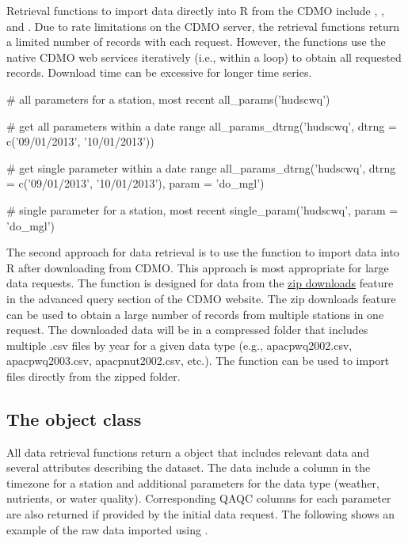 Retrieval functions to import data directly into R from the CDMO include , , and . Due to rate limitations on the CDMO server, the retrieval functions return a limited number of records with each request.  However, the  functions use the native CDMO web services iteratively (i.e., within a loop) to obtain all requested records.  Download time can be excessive for longer time series.     
\begin{example}
# all parameters for a station, most recent
all_params('hudscwq')

# get all parameters within a date range
all_params_dtrng('hudscwq', dtrng = c('09/01/2013', '10/01/2013'))

# get single parameter within a date range
all_params_dtrng('hudscwq', dtrng = c('09/01/2013', '10/01/2013'), 
  param = 'do_mgl')

# single parameter for a station, most recent
single_param('hudscwq', param = 'do_mgl')
\end{example}

The second approach for data retrieval is to use the  function to import data into R after downloading from CDMO.  This approach is most appropriate for large data requests. The  function is designed for data from the \href{http://cdmo.baruch.sc.edu/aqs/zips.cfm}{zip downloads} feature in the advanced query section of the CDMO website. The zip downloads feature can be used to obtain a large number of records from multiple stations in one request.  The downloaded data will be in a compressed folder that includes multiple .csv files by year for a given data type (e.g., apacpwq2002.csv, apacpwq2003.csv, apacpnut2002.csv, etc.).  The  function can be used to import files directly from the zipped folder.

\subsection{The  object class}

All data retrieval functions return a  object that includes relevant data and several attributes describing the dataset.  The data include a  column in the timezone for a station and additional parameters for the data type (weather, nutrients, or water quality).  Corresponding QAQC columns for each parameter are also returned if provided by the initial data request.  The following shows an example of the raw data imported using .

